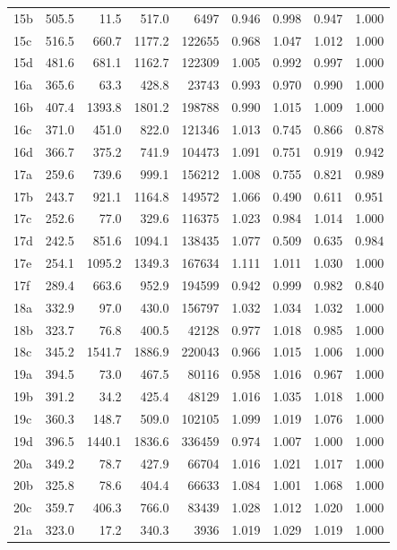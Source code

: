 \begin{center}
\begin{longtable}{@{}l@{\hspace{6pt}}rrrr@{\hspace{8pt}}rrrr@{}}
15b & 505.5 & 11.5 & 517.0 & 6497 & 0.946 & 0.998 & 0.947 & 1.000 \\
15c & 516.5 & 660.7 & 1177.2 & 122655 & 0.968 & 1.047 & 1.012 & 1.000 \\
15d & 481.6 & 681.1 & 1162.7 & 122309 & 1.005 & 0.992 & 0.997 & 1.000 \\
16a & 365.6 & 63.3 & 428.8 & 23743 & 0.993 & 0.970 & 0.990 & 1.000 \\
16b & 407.4 & 1393.8 & 1801.2 & 198788 & 0.990 & 1.015 & 1.009 & 1.000 \\
16c & 371.0 & 451.0 & 822.0 & 121346 & 1.013 & 0.745 & 0.866 & 0.878 \\
16d & 366.7 & 375.2 & 741.9 & 104473 & 1.091 & 0.751 & 0.919 & 0.942 \\
17a & 259.6 & 739.6 & 999.1 & 156212 & 1.008 & 0.755 & 0.821 & 0.989 \\
17b & 243.7 & 921.1 & 1164.8 & 149572 & 1.066 & 0.490 & 0.611 & 0.951 \\
17c & 252.6 & 77.0 & 329.6 & 116375 & 1.023 & 0.984 & 1.014 & 1.000 \\
17d & 242.5 & 851.6 & 1094.1 & 138435 & 1.077 & 0.509 & 0.635 & 0.984 \\
17e & 254.1 & 1095.2 & 1349.3 & 167634 & 1.111 & 1.011 & 1.030 & 1.000 \\
17f & 289.4 & 663.6 & 952.9 & 194599 & 0.942 & 0.999 & 0.982 & 0.840 \\
18a & 332.9 & 97.0 & 430.0 & 156797 & 1.032 & 1.034 & 1.032 & 1.000 \\
18b & 323.7 & 76.8 & 400.5 & 42128 & 0.977 & 1.018 & 0.985 & 1.000 \\
18c & 345.2 & 1541.7 & 1886.9 & 220043 & 0.966 & 1.015 & 1.006 & 1.000 \\
19a & 394.5 & 73.0 & 467.5 & 80116 & 0.958 & 1.016 & 0.967 & 1.000 \\
19b & 391.2 & 34.2 & 425.4 & 48129 & 1.016 & 1.035 & 1.018 & 1.000 \\
19c & 360.3 & 148.7 & 509.0 & 102105 & 1.099 & 1.019 & 1.076 & 1.000 \\
19d & 396.5 & 1440.1 & 1836.6 & 336459 & 0.974 & 1.007 & 1.000 & 1.000 \\
20a & 349.2 & 78.7 & 427.9 & 66704 & 1.016 & 1.021 & 1.017 & 1.000 \\
20b & 325.8 & 78.6 & 404.4 & 66633 & 1.084 & 1.001 & 1.068 & 1.000 \\
20c & 359.7 & 406.3 & 766.0 & 83439 & 1.028 & 1.012 & 1.020 & 1.000 \\
21a & 323.0 & 17.2 & 340.3 & 3936 & 1.019 & 1.029 & 1.019 & 1.000 \\

\end{longtable}
\end{center}
